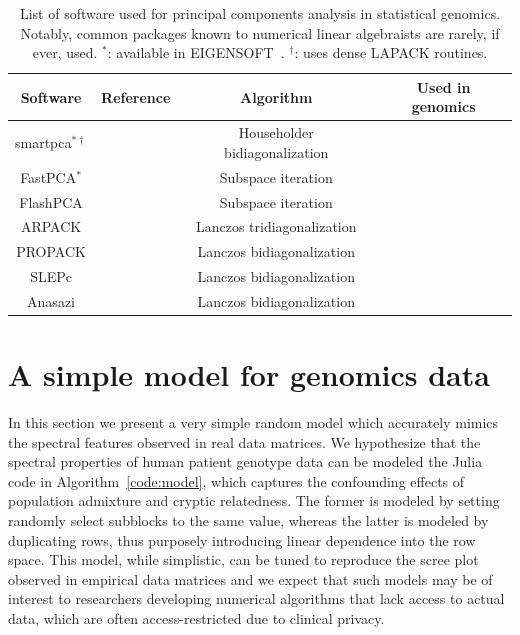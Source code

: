 \documentclass[review]{siamart0516}
\newcommand{\cmark}{\ding{51}}%
\newcommand{\xmark}{\ding{55}}%
\begin{document}
\begin{table}
    \centering
    \caption{List of software used for principal components analysis in statistical
    genomics. Notably, common packages known to numerical linear algebraists are
    rarely, if ever, used.
    $^*$: available in EIGENSOFT~\cite{Patterson2006}.
    $^\dagger$: uses dense LAPACK routines.
    \label{tab:sw}}
    \begin{tabular}{cccc}
       \hline
        Software         & Reference & Algorithm                              & Used in genomics \\ \hline
        smartpca$^{*\dagger}$ & \cite{Patterson2006} & Householder bidiagonalization & \cmark \\ FastPCA$^*$ & \cite{Galinsky2016} & Subspace iteration        & \cmark \\
        FlashPCA         & \cite{abraham2014fast} & Subspace iteration      & \cmark \\ \hline
        ARPACK           & \cite{Lehoucq1996} & Lanczos tridiagonalization  & \xmark \\
        PROPACK          & \cite{Larsen1998} & Lanczos bidiagonalization    & \xmark \\
        SLEPc            & \cite{Hernandez2008} & Lanczos bidiagonalization & \xmark \\
        Anasazi          & \cite{Baker2009} & Lanczos bidiagonalization     & \xmark \\ \hline
    \end{tabular}
\end{table}

\label{sec:model}
\section{A simple model for genomics data}

In this section we present a very simple random model which accurately mimics
the spectral features observed in real data matrices.
We hypothesize that the spectral properties of human patient genotype data can
be modeled the Julia code in Algorithm~\ref{code:model}, which captures the
confounding effects of population admixture and cryptic relatedness.
The former is modeled by setting randomly select subblocks to the same value,
whereas the latter is modeled by duplicating rows, thus purposely introducing
linear dependence into the row space. This model, while simplistic, can be
tuned to reproduce the scree plot observed in empirical data matrices and we
expect that such models may be of interest to researchers developing numerical
algorithms that lack access to actual data, which are often access-restricted
due to clinical privacy.
\end{document}
